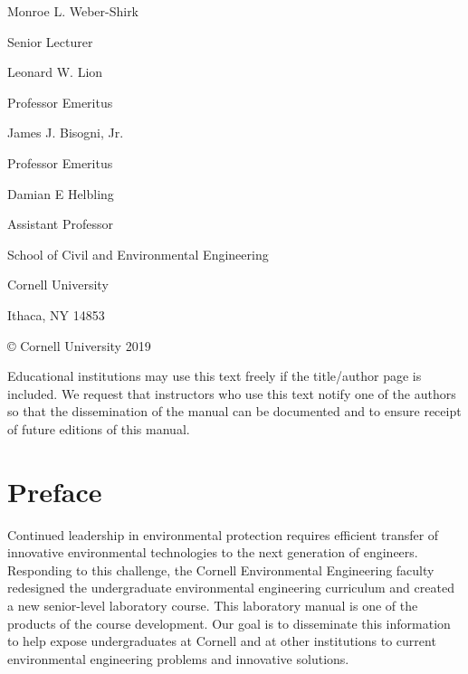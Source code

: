 \documentclass[letterpaper,10pt,english]{sphinxmanual}
\begin{document}
\begin{DUlineblock}{0em}
\item[] Monroe L. Weber-Shirk
\item[] Senior Lecturer
\end{DUlineblock}

\begin{DUlineblock}{0em}
\item[] Leonard W. Lion
\item[] Professor Emeritus
\end{DUlineblock}

\begin{DUlineblock}{0em}
\item[] James J. Bisogni, Jr.
\item[] Professor Emeritus
\end{DUlineblock}

\begin{DUlineblock}{0em}
\item[] Damian E Helbling
\item[] Assistant Professor
\end{DUlineblock}

\begin{DUlineblock}{0em}
\item[] School of Civil and Environmental Engineering
\item[] Cornell University
\item[] Ithaca, NY 14853
\end{DUlineblock}

© Cornell University 2019

Educational institutions may use this text freely if the title/author page is included. We request that instructors who use this text notify one of the authors so that the dissemination of the manual can be documented and to ensure receipt of future editions of this manual.


\section{Preface}
\label{\detokenize{Title_and_Preface/Title_and_Preface:preface}}
Continued leadership in environmental protection requires efficient transfer of innovative environmental technologies to the next generation of engineers. Responding to this challenge, the Cornell Environmental Engineering faculty redesigned the undergraduate environmental engineering curriculum and created a new senior-level laboratory course. This laboratory manual is one of the products of the course development. Our goal is to disseminate this information to help expose undergraduates at Cornell and at other institutions to current environmental engineering problems and innovative solutions.
\end{document}
